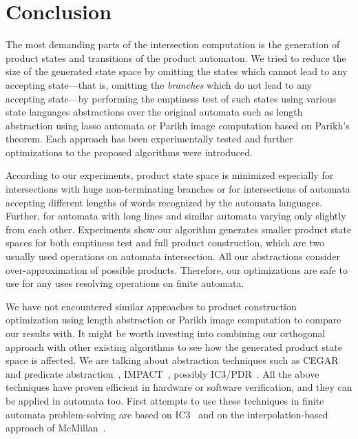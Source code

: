 \chapter{Conclusion}

The most demanding parts of the intersection computation is the generation of product states and transitions of the product automaton. We tried to reduce the size of the generated state space by omitting the states which cannot lead to any accepting state---that is, omitting the \textit{branches} which do not lead to any accepting state---by performing the emptiness test of such states using various state languages abstractions over the original automata such as length abstraction using lasso automata or Parikh image computation based on Parikh's theorem. Each approach has been experimentally tested and further optimizations to the proposed algorithms were introduced.

According to our experiments, product state space is minimized especially for intersections with huge non-terminating branches or for intersections of automata accepting different lengths of words recognized by the automata languages. Further, for automata with long lines and similar automata varying only slightly from each other. Experiments show our algorithm generates smaller product state spaces for both emptiness test and full product construction, which are two usually used operations on automata intersection. All our abstractions consider over-approximation of possible products. Therefore, our optimizations are safe to use for any uses resolving operations on finite automata.

We have not encountered similar approaches to product construction optimization using length abstraction or Parikh image computation to compare our results with. It might be worth investing into combining our orthogonal approach with other existing algorithms to see how the generated product state space is affected. We are talking about abstraction techniques such as CEGAR~\cite{DBLP:conf/cav/ClarkeGJLV00} and predicate abstraction~\cite{DBLP:conf/cav/ColonU98, DBLP:conf/cav/GrafS97}, IMPACT~\cite{DBLP:conf/cav/McMillan06}, possibly IC3/PDR~\cite{DBLP:conf/sat/HoderB12, DBLP:conf/fmcad/BradleyM07}. All the above techniques have proven efficient in hardware or software verification, and they can be applied in automata too. First attempts to use these techniques in finite automata problem-solving are based on IC3~\cite{DBLP:journals/pacmpl/HolikJLRV18, DBLP:conf/cav/WangTLYJ16, DBLP:journals/corr/abs-1708-09073} and on the interpolation-based approach of McMillan~\cite{DBLP:conf/tacas/AmlaM07, DBLP:conf/tacas/GangeNSSS13}.
